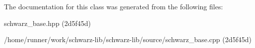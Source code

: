 The documentation for this class was generated from the following files\+:\begin{DoxyCompactItemize}
\item 
schwarz\+\_\+base.\+hpp (2d5f45d)\item 
/home/runner/work/schwarz-\/lib/schwarz-\/lib/source/schwarz\+\_\+base.\+cpp (2d5f45d)\end{DoxyCompactItemize}
